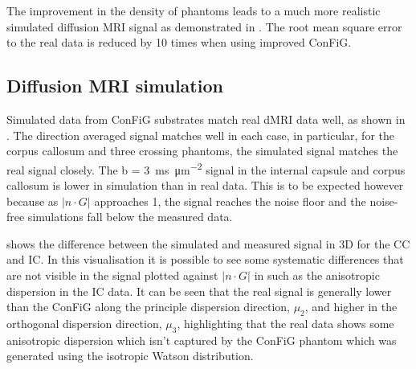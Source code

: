 The improvement in the density of phantoms leads to a much more realistic simulated diffusion \ac{MRI} signal as demonstrated in . The root mean square error to the real data is reduced by 10 times when using improved \ac{ConFiG}.


\subsection{Diffusion \ac{MRI} simulation}
\label{sec:config_result_dmri_sim}
Simulated data from \ac{ConFiG} substrates match real \ac{dMRI} data well, as shown in . The direction averaged signal matches well in each case, in particular, for the corpus callosum and three crossing phantoms, the simulated signal matches the real signal closely. The b = \SI{3}{\milli\second\per\micro\metre\squared} signal in the internal capsule and corpus callosum is lower in simulation than in real data. This is to be expected however because as $|n\cdot G|$ approaches 1, the signal reaches the noise floor and the noise-free simulations fall below the measured data.

 shows the difference between the simulated and measured signal in 3D for the \acl{CC} and \acl{IC}. In this visualisation it is possible to see some systematic differences that are not visible in the signal plotted against $|n\cdot G|$ in  such as the anisotropic dispersion in the \ac{IC} data.
It can be seen that the real signal is generally lower than the \ac{ConFiG} along the principle dispersion direction, $\mu_2$, and higher in the orthogonal dispersion direction, $\mu_3$, highlighting that the real data shows some anisotropic dispersion which isn't captured by the \ac{ConFiG} phantom which was generated using the isotropic Watson distribution. 

